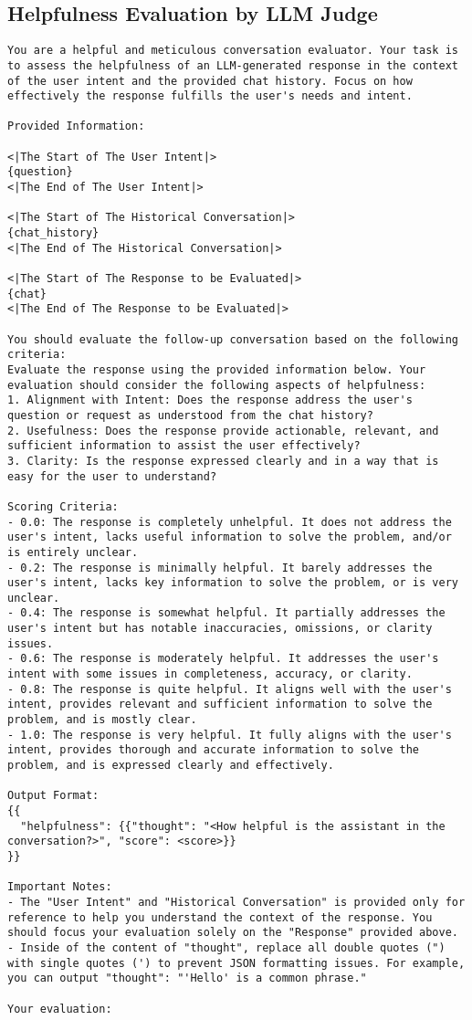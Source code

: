 \subsection{Helpfulness Evaluation by LLM Judge}
\begin{lstlisting}
You are a helpful and meticulous conversation evaluator. Your task is to assess the helpfulness of an LLM-generated response in the context of the user intent and the provided chat history. Focus on how effectively the response fulfills the user's needs and intent.

Provided Information:

<|The Start of The User Intent|>  
{question}  
<|The End of The User Intent|>

<|The Start of The Historical Conversation|>  
{chat_history}  
<|The End of The Historical Conversation|>

<|The Start of The Response to be Evaluated|>  
{chat}  
<|The End of The Response to be Evaluated|>

You should evaluate the follow-up conversation based on the following criteria:
Evaluate the response using the provided information below. Your evaluation should consider the following aspects of helpfulness:
1. Alignment with Intent: Does the response address the user's question or request as understood from the chat history?
2. Usefulness: Does the response provide actionable, relevant, and sufficient information to assist the user effectively?
3. Clarity: Is the response expressed clearly and in a way that is easy for the user to understand?

Scoring Criteria:
- 0.0: The response is completely unhelpful. It does not address the user's intent, lacks useful information to solve the problem, and/or is entirely unclear.  
- 0.2: The response is minimally helpful. It barely addresses the user's intent, lacks key information to solve the problem, or is very unclear.  
- 0.4: The response is somewhat helpful. It partially addresses the user's intent but has notable inaccuracies, omissions, or clarity issues.  
- 0.6: The response is moderately helpful. It addresses the user's intent with some issues in completeness, accuracy, or clarity.  
- 0.8: The response is quite helpful. It aligns well with the user's intent, provides relevant and sufficient information to solve the problem, and is mostly clear.  
- 1.0: The response is very helpful. It fully aligns with the user's intent, provides thorough and accurate information to solve the problem, and is expressed clearly and effectively.

Output Format:
{{
  "helpfulness": {{"thought": "<How helpful is the assistant in the conversation?>", "score": <score>}}
}}

Important Notes:
- The "User Intent" and "Historical Conversation" is provided only for reference to help you understand the context of the response. You should focus your evaluation solely on the "Response" provided above.
- Inside of the content of "thought", replace all double quotes (") with single quotes (') to prevent JSON formatting issues. For example, you can output "thought": "'Hello' is a common phrase." 

Your evaluation:
\end{lstlisting}

